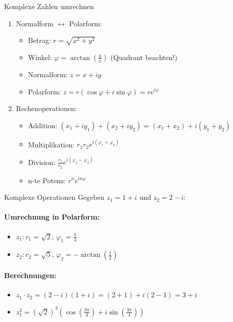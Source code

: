 \begin{KR}{Komplexe Zahlen umrechnen}
\begin{enumerate}
    \item Normalform $\leftrightarrow$ Polarform:
    \begin{itemize}
        \item Betrag: $r = \sqrt{x^2 + y^2}$
        \item Winkel: $\varphi = \arctan(\frac{y}{x})$ (Quadrant beachten!)
        \item Normalform: $z = x + iy$
        \item Polarform: $z = r(\cos\varphi + i\sin\varphi) = re^{i\varphi}$
    \end{itemize}
    
    \item Rechenoperationen:
    \begin{itemize}
        \item Addition: $(x_1 + iy_1) + (x_2 + iy_2) = (x_1+x_2) + i(y_1+y_2)$
        \item Multiplikation: $r_1r_2e^{i(\varphi_1 + \varphi_2)}$
        \item Division: $\frac{r_1}{r_2}e^{i(\varphi_1 - \varphi_2)}$
        \item n-te Potenz: $r^ne^{in\varphi}$
    \end{itemize}
\end{enumerate}
\end{KR}

\begin{example2}{Komplexe Operationen}
Gegeben $z_1 = 1+i$ und $z_2 = 2-i$:

\paragraph{Umrechnung in Polarform:}
\begin{itemize}
    \item $z_1: r_1 = \sqrt{2}$, $\varphi_1 = \frac{\pi}{4}$
    \item $z_2: r_2 = \sqrt{5}$, $\varphi_2 = -\arctan(\frac{1}{2})$
\end{itemize}

\paragraph{Berechnungen:}
\begin{itemize}
    \item $z_1 \cdot z_2 = (2-i)(1+i) = (2+1) + i(2-1) = 3+i$
    \item $z_1^3 = (\sqrt{2})^3(\cos(\frac{3\pi}{4}) + i\sin(\frac{3\pi}{4}))$
\end{itemize}
\end{example2}

